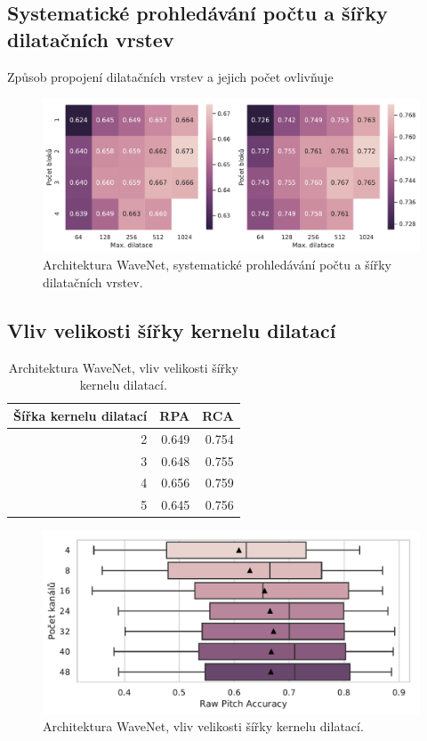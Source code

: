 \subsection{Systematické prohledávání počtu a šířky dilatačních vrstev}

Způsob propojení dilatačních vrstev a jejich počet ovlivňuje 

\begin{figure}[h]\centering
    \includegraphics[scale=0.5]{../img/figures/wavenet_stacks_gridsearch.pdf}
\caption{Architektura WaveNet, systematické prohledávání počtu a šířky dilatačních vrstev.}\label{obr:wavenet_stacks_gridsearch}
\end{figure}


\subsection{Vliv velikosti šířky kernelu dilatací}

\begin{table}[h!]
\centering
    \begin{tabular}{rrr}
    \toprule
    Šířka kernelu dilatací &   RPA &   RCA \\
    \midrule
                        2 & 0.649 & 0.754 \\
                        3 & 0.648 & 0.755 \\
                        4 & 0.656 & 0.759 \\
                        5 & 0.645 & 0.756 \\
    \bottomrule
    \end{tabular}
\caption{Architektura WaveNet, vliv velikosti šířky kernelu dilatací.}\label{tab:wavenet_dilation_width}
\end{table}

\begin{figure}[h]\centering
    \includegraphics[scale=0.6]{../img/figures/wavenet_dil_skip_channels.pdf}
\caption{Architektura WaveNet, vliv velikosti šířky kernelu dilatací.}\label{obr:wavenet_dilation_width}
\end{figure}

